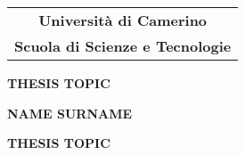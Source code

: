 \documentclass{report}
\begin{document}
\nocite{*}


\begin{titlepage}

\vspace*{0.5cm}
\thispagestyle{empty}

\begin{center}
\renewcommand{\arraystretch}{1}
\begin{tabular}{c}
 \Huge{\textbf{Universit\`{a} di Camerino}}
\\
\LARGE\textbf{Scuola  di  Scienze  e Tecnologie}
\end{tabular}
\renewcommand{\arraystretch}{-0.1}



\vspace*{6cm}
\begin{Huge}
\textbf{THESIS TOPIC}
\end{Huge}

\vspace{6cm}
\begin{huge}
\textbf{NAME SURNAME}
\end{huge}
\end{center}



\newpage
\thispagestyle{empty}
\vspace*{1cm}
\begin{center}
\Huge{\textbf{THESIS TOPIC}}


\end{center}
\end{titlepage}
\end{document}
